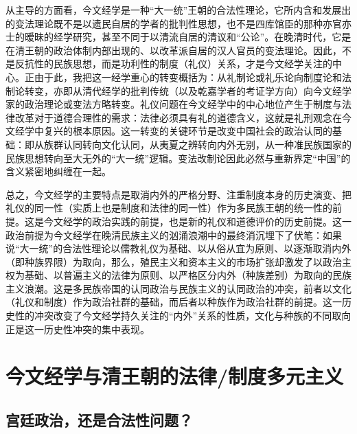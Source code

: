 \documentclass[a4paper, 12pt, openright]{ctexbook}
\begin{document}
从主导的方面看，今文经学是一种“大一统”王朝的合法性理论，它所内含和发展出的变法理论既不是以遗民自居的学者的批判性思想，也不是四库馆臣的那种亦官亦士的暧昧的经学研究，甚至不同于以清流自居的清议和“公论”。在晚清时代，它是在清王朝的政治体制内部出现的、以改革派自居的汉人官员的变法理论。因此，不是反抗性的民族思想，而是功利性的制度（礼仪）关系，才是今文经学关注的中心。正由于此，我把这一经学重心的转变概括为：从礼制论或礼乐论向制度论和法制论转变，亦即从清代经学的批判传统（以及乾嘉学者的考证学方向）向今文经学家的政治理论或变法方略转变。礼仪问题在今文经学中的中心地位产生于制度与法律改革对于道德合理性的需求：法律必须具有礼的道德含义，这就是礼刑观念在今文经学中复兴的根本原因。这一转变的关键环节是改变中国社会的政治认同的基础：即从族群认同转向文化认同，从夷夏之辨转向内外无别，从一种准民族国家的民族思想转向至大无外的“大一统”逻辑。变法改制论因此必然与重新界定“中国”的含义紧密地纠缠在一起。

总之，今文经学的主要特点是取消内外的严格分野、注重制度本身的历史演变、把礼仪的同一性（实质上也是制度和法律的同一性）作为多民族王朝的统一性的前提。这是今文经学的政治实践的前提，也是新的礼仪和道德评价的历史前提。这一政治前提为今文经学在晚清民族主义的汹涌浪潮中的最终消沉埋下了伏笔：如果说“大一统”的合法性理论以儒教礼仪为基础、以从俗从宜为原则、以逐渐取消内外（即种族界限）为取向，那么，殖民主义和资本主义的市场扩张却激发了以政治主权为基础、以普遍主义的法律为原则、以严格区分内外（种族差别）为取向的民族主义浪潮。这是多民族帝国的认同政治与民族主义的认同政治的冲突，前者以文化（礼仪和制度）作为政治社群的基础，而后者以种族作为政治社群的前提。这一历史性的冲突改变了今文经学持久关注的“内外”关系的性质，文化与种族的不同取向正是这一历史性冲突的集中表现。

\section{今文经学与清王朝的法律/制度多元主义}

\subsection{宫廷政治，还是合法性问题？}
\end{document}
